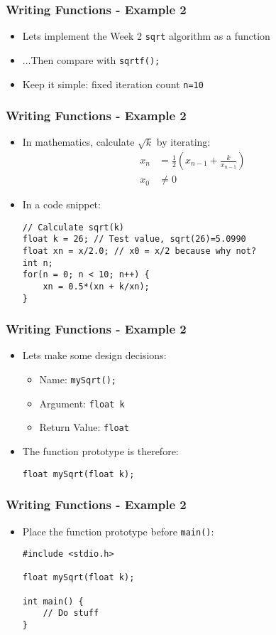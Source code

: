 \documentclass[14pt]{beamer}
\begin{document}
\begin{frame}[fragile]
\frametitle{Writing Functions - Example 2}
\begin{itemize}
\item Lets implement the Week 2 \texttt{sqrt} algorithm as a function
\item ...Then compare with \texttt{sqrtf();}
\item Keep it simple: fixed iteration count \texttt{n=10}

\end{itemize}
\end{frame}

\begin{frame}[fragile]
\frametitle{Writing Functions - Example 2}
\begin{itemize}
\item In mathematics, calculate $\sqrt{k}$ by iterating:
\begin{align*}
x_n &= \frac{1}{2}\left(x_{n-1} + \frac{k}{x_{n-1}}\right)\\
x_0 &\neq 0
\end{align*}
\item In a code snippet:
\begin{lstlisting}[style=CStyle]
// Calculate sqrt(k)
float k = 26; // Test value, sqrt(26)=5.0990
float xn = x/2.0; // x0 = x/2 because why not?
int n;
for(n = 0; n < 10; n++) {
	xn = 0.5*(xn + k/xn);
}
\end{lstlisting}
\end{itemize}
\end{frame}

\begin{frame}[fragile]
\frametitle{Writing Functions - Example 2}
\begin{itemize}
\item Lets make some design decisions:
	\begin{itemize}
		\item Name: \texttt{mySqrt();}
		\item Argument: \texttt{float k}
		\item Return Value: \texttt{float}
	\end{itemize}
\item The function prototype is therefore:
\begin{lstlisting}[style=CStyle]
float mySqrt(float k);
\end{lstlisting}
\end{itemize}
\end{frame}

\begin{frame}[fragile]
\frametitle{Writing Functions - Example 2}
\begin{itemize}
\item Place the function prototype before \texttt{main()}:
\begin{lstlisting}[style=CStyle]
#include <stdio.h>

float mySqrt(float k);

int main() {
	// Do stuff
}
\end{lstlisting}
\end{itemize}
\end{frame}
\end{document}
